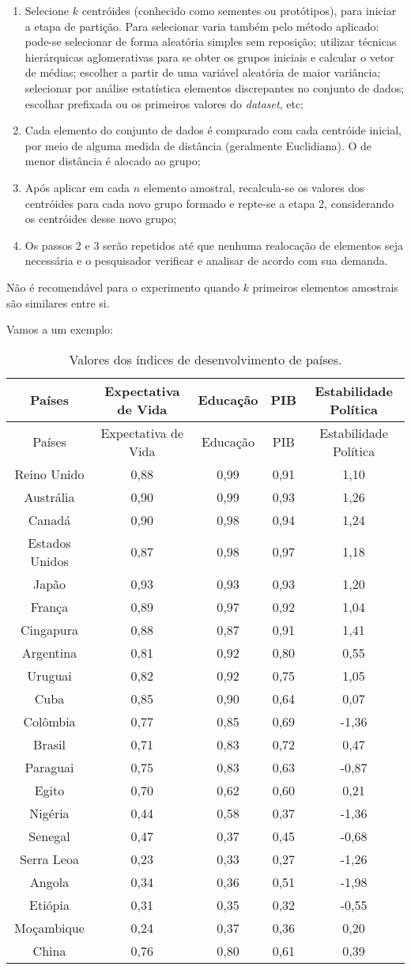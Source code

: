 \documentclass[
  openany]{book}
\begin{document}
\begin{enumerate}
\def\labelenumi{\arabic{enumi}.}
\item
  Selecione \(k\) centróides (conhecido como sementes ou protótipos), para iniciar a etapa de partição. Para selecionar varia também pelo método aplicado: pode-se selecionar de forma aleatória simples sem reposição; utilizar técnicas hierárquicas aglomerativas para se obter os grupos iniciais e calcular o vetor de médias; escolher a partir de uma variável aleatória de maior variância; selecionar por análise estatística elementos discrepantes no conjunto de dados; escolhar prefixada ou os primeiros valores do \emph{dataset}, etc;
\item
  Cada elemento do conjunto de dados é comparado com cada centróide inicial, por meio de alguma medida de distância (geralmente Euclidiana). O de menor distância é alocado ao grupo;
\item
  Após aplicar em cada \(n\) elemento amostral, recalcula-se os valores dos centróides para cada novo grupo formado e repte-se a etapa 2, considerando os centróides desse novo grupo;
\item
  Os passos 2 e 3 serão repetidos até que nenhuma realocação de elementos seja necessária e o pesquisador verificar e analisar de acordo com sua demanda.
\end{enumerate}

Não é recomendável para o experimento quando \(k\) primeiros elementos amostrais são similares entre si.

Vamos a um exemplo:

\begin{longtable}[]{@{}ccccc@{}}
\caption{\label{tab:desenv} Valores dos índices de desenvolvimento de países.}\tabularnewline
\toprule
Países & Expectativa de Vida & Educação & PIB & Estabilidade Política\tabularnewline
\midrule
\endfirsthead
\toprule
Países & Expectativa de Vida & Educação & PIB & Estabilidade Política\tabularnewline
\midrule
\endhead
Reino Unido & 0,88 & 0,99 & 0,91 & 1,10\tabularnewline
Austrália & 0,90 & 0,99 & 0,93 & 1,26\tabularnewline
Canadá & 0,90 & 0,98 & 0,94 & 1,24\tabularnewline
Estados Unidos & 0,87 & 0,98 & 0,97 & 1,18\tabularnewline
Japão & 0,93 & 0,93 & 0,93 & 1,20\tabularnewline
França & 0,89 & 0,97 & 0,92 & 1,04\tabularnewline
Cingapura & 0,88 & 0,87 & 0,91 & 1,41\tabularnewline
Argentina & 0,81 & 0,92 & 0,80 & 0,55\tabularnewline
Uruguai & 0,82 & 0,92 & 0,75 & 1,05\tabularnewline
Cuba & 0,85 & 0,90 & 0,64 & 0,07\tabularnewline
Colômbia & 0,77 & 0,85 & 0,69 & -1,36\tabularnewline
Brasil & 0,71 & 0,83 & 0,72 & 0,47\tabularnewline
Paraguai & 0,75 & 0,83 & 0,63 & -0,87\tabularnewline
Egito & 0,70 & 0,62 & 0,60 & 0,21\tabularnewline
Nigéria & 0,44 & 0,58 & 0,37 & -1,36\tabularnewline
Senegal & 0,47 & 0,37 & 0,45 & -0,68\tabularnewline
Serra Leoa & 0,23 & 0,33 & 0,27 & -1,26\tabularnewline
Angola & 0,34 & 0,36 & 0,51 & -1,98\tabularnewline
Etiópia & 0,31 & 0,35 & 0,32 & -0,55\tabularnewline
Moçambique & 0,24 & 0,37 & 0,36 & 0,20\tabularnewline
China & 0,76 & 0,80 & 0,61 & 0,39\tabularnewline
\bottomrule
\end{longtable}
\end{document}
